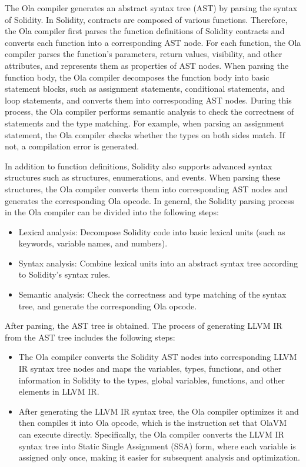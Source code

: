 The Ola compiler generates an abstract syntax tree (AST) by parsing the syntax of Solidity. In Solidity, contracts are composed of various functions. Therefore, the Ola compiler first parses the function definitions of Solidity contracts and converts each function into a corresponding AST node. For each function, the Ola compiler parses the function's parameters, return values, visibility, and other attributes, and represents them as properties of AST nodes. When parsing the function body, the Ola compiler decomposes the function body into basic statement blocks, such as assignment statements, conditional statements, and loop statements, and converts them into corresponding AST nodes. During this process, the Ola compiler performs semantic analysis to check the correctness of statements and the type matching. For example, when parsing an assignment statement, the Ola compiler checks whether the types on both sides match. If not, a compilation error is generated.

In addition to function definitions, Solidity also supports advanced syntax structures such as structures, enumerations, and events. When parsing these structures, the Ola compiler converts them into corresponding AST nodes and generates the corresponding Ola opcode. In general, the Solidity parsing process in the Ola compiler can be divided into the following steps:

\begin{itemize}
    \item Lexical analysis: Decompose Solidity code into basic lexical units (such as keywords, variable names, and numbers).
    \item Syntax analysis: Combine lexical units into an abstract syntax tree according to Solidity's syntax rules.
    \item Semantic analysis: Check the correctness and type matching of the syntax tree, and generate the corresponding Ola opcode.
\end{itemize}

After parsing, the AST tree is obtained. The process of generating LLVM IR from the AST tree includes the following steps:

\begin{itemize}
    \item The Ola compiler converts the Solidity AST nodes into corresponding LLVM IR syntax tree nodes and maps the variables, types, functions, and other information in Solidity to the types, global variables, functions, and other elements in LLVM IR.
    \item After generating the LLVM IR syntax tree, the Ola compiler optimizes it and then compiles it into Ola opcode, which is the instruction set that OlaVM can execute directly. Specifically, the Ola compiler converts the LLVM IR syntax tree into Static Single Assignment (SSA) form, where each variable is assigned only once, making it easier for subsequent analysis and optimization.
\end{itemize}


